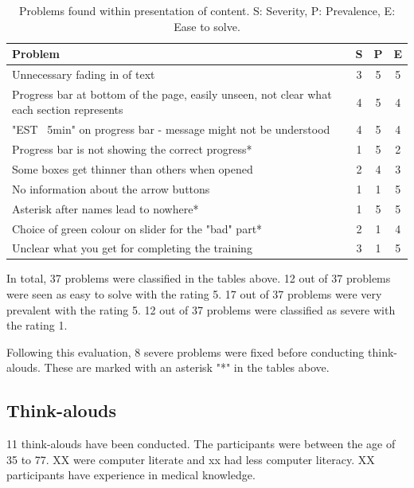 \documentclass{sigchi}
\begin{document}
\begin{table}[H]
    \centering
    \begin{tabular}{|m{6.5cm}|c|c|c|}
    \hline
        \textbf{Problem} & \textbf{S} & \textbf{P} & \textbf{E}\\
    \hline
         Unnecessary fading in of text & 3 & 5 & 5\\
    \hline
         Progress bar at bottom of the page, easily unseen, not clear what each section represents & 4 & 5 & 4\\
    \hline
         "EST ~5min" on progress bar - message might not be understood & 4 & 5 & 4\\
    \hline
         Progress bar is not showing the correct progress* & 1 & 5 & 2\\
    \hline
         Some boxes get thinner than others when opened & 2 & 4 & 3\\
    \hline
         No information about the arrow buttons & 1 & 1 & 5\\
    \hline
         Asterisk after names lead to nowhere* & 1 & 5 & 5\\
    \hline
         Choice of green colour on slider for the "bad" part* & 2 & 1 & 4\\
    \hline
         Unclear what you get for completing the training & 3 & 1 & 5\\
    \hline
    \end{tabular}
    \caption{Problems found within presentation of content. S: Severity, P: Prevalence, E: Ease to solve.}
    \label{tab:content}
\end{table}

In total, 37 problems were classified in the tables above. 12 out of 37 problems were seen as easy to solve with the rating 5. 17 out of 37 problems were very prevalent with the rating 5. 12 out of 37 problems were classified as severe with the rating 1. 

Following this evaluation, 8 severe problems were fixed before conducting think-alouds. These are marked with an asterisk "*" in the tables above.

\subsection{Think-alouds}
11 think-alouds have been conducted. The participants were between the age of 35 to 77. XX were computer literate and xx had less computer literacy. XX participants have experience in medical knowledge. 
\end{document}
